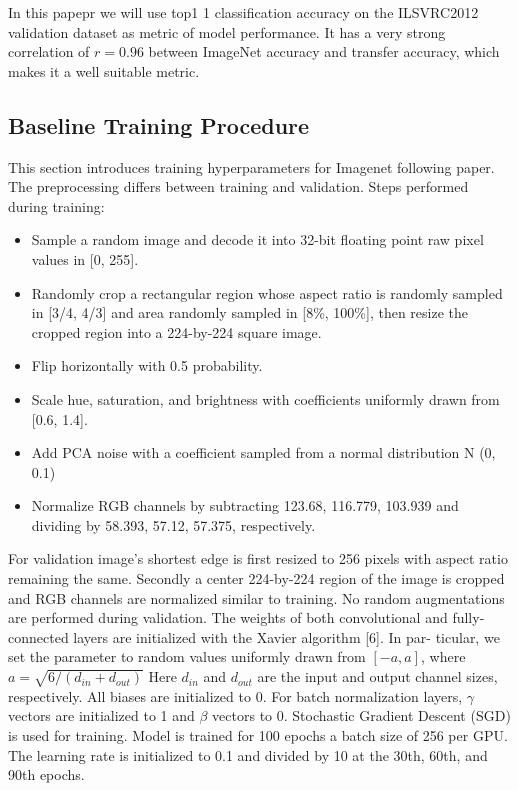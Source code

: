 In this papepr we will use top1 1 classification accuracy on the ILSVRC2012 validation dataset as metric of model performance. It has a very strong correlation of $r=0.96$ \cite{kornblith2019better} between ImageNet accuracy and transfer accuracy, which makes it a well suitable metric.  

\subsection{Baseline Training Procedure} \label{subsec: baseline_training}
This section introduces training hyperparameters for Imagenet following \cite{he2016identity_resnetv2} paper. The preprocessing differs between training and validation. Steps performed during training:
\begin{itemize}
    \item Sample a random image and decode it into 32-bit floating point raw pixel values in [0, 255].
    \item Randomly crop a rectangular region whose aspect ratio is randomly sampled in [3/4, 4/3] and area randomly sampled in [8\%, 100\%], then resize the cropped region into a 224-by-224 square image.
    \item Flip horizontally with 0.5 probability.
    \item Scale hue, saturation, and brightness with coefficients uniformly drawn from [0.6, 1.4].
    \item Add PCA noise with a coefficient sampled from a normal distribution N (0, 0.1)
    \item Normalize RGB channels by subtracting 123.68, 116.779, 103.939 and dividing by 58.393, 57.12, 57.375, respectively.
\end{itemize}

For validation image's shortest edge is first resized to 256 pixels with aspect ratio remaining the same. Secondly a center 224-by-224 region of the image is cropped and RGB channels are normalized similar to training. No random augmentations are performed during validation. 
The weights of both convolutional and fully-connected layers are initialized with the Xavier algorithm [6]. In par- ticular, we set the parameter to random values uniformly drawn from $[−a, a]$, where $ a = \sqrt{6 / (d_{in} + d_{out})} $ Here $d_{in}$ and $d_{out}$ are the input and output channel sizes, respectively. All biases are initialized to 0. For batch normalization layers, $\gamma$ vectors are initialized to 1 and $\beta$ vectors to 0.
Stochastic Gradient Descent (SGD) \cite{something} is used for training. Model is trained for 100 epochs a batch size of 256 per GPU. The learning rate is initialized to 0.1 and divided by 10 at the 30th, 60th, and 90th epochs.

